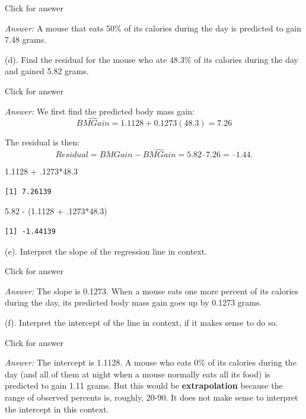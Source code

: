 \documentclass[
]{book}
\newenvironment{Shaded}{\begin{snugshade}}{\end{snugshade}}
\newcommand{\DecValTok}[1]{\textcolor[rgb]{0.00,0.00,0.81}{#1}}
\newcommand{\FloatTok}[1]{\textcolor[rgb]{0.00,0.00,0.81}{#1}}
\newcommand{\NormalTok}[1]{#1}
\newcommand{\SpecialCharTok}[1]{\textcolor[rgb]{0.00,0.00,0.00}{#1}}
\begin{document}
Click for answer

\emph{Answer:} A mouse that eats 50\% of its calories during the day is predicted to gain 7.48 grams.

(d). Find the residual for the mouse who ate 48.3\% of its calories during the day and gained 5.82 grams.

Click for answer

\emph{Answer:} We first find the predicted body mass gain:
\[
\widehat{BMGain} = 1.1128+0.1273(48.3)=7.26
\]

The residual is then:\\
\[
Residual = BMGain  -   \widehat{BMGain} =  5.82 – 7.26 = –1.44.
\]

\begin{Shaded}
\begin{Highlighting}[]
\FloatTok{1.1128} \SpecialCharTok{+}\NormalTok{ .}\DecValTok{1273}\SpecialCharTok{*}\FloatTok{48.3}
\end{Highlighting}
\end{Shaded}

\begin{verbatim}
[1] 7.26139
\end{verbatim}

\begin{Shaded}
\begin{Highlighting}[]
\FloatTok{5.82} \SpecialCharTok{{-}}\NormalTok{ (}\FloatTok{1.1128} \SpecialCharTok{+}\NormalTok{ .}\DecValTok{1273}\SpecialCharTok{*}\FloatTok{48.3}\NormalTok{)}
\end{Highlighting}
\end{Shaded}

\begin{verbatim}
[1] -1.44139
\end{verbatim}

(e). Interpret the slope of the regression line in context.

Click for answer

\emph{Answer:} The slope is 0.1273. When a mouse eats one more percent of its calories during the day, its predicted body mass gain goes up by 0.1273 grams.

(f). Interpret the intercept of the line in context, if it makes sense to do so.

Click for answer

\emph{Answer:} The intercept is 1.1128. A mouse who eats 0\% of its calories during the day (and all of them at night when a mouse normally eats all its food) is predicted to gain 1.11 grams. But this would be \textbf{extrapolation} because the range of observed percents is, roughly, 20-90. It does not make sense to interpret the intercept in this context.
\end{document}
